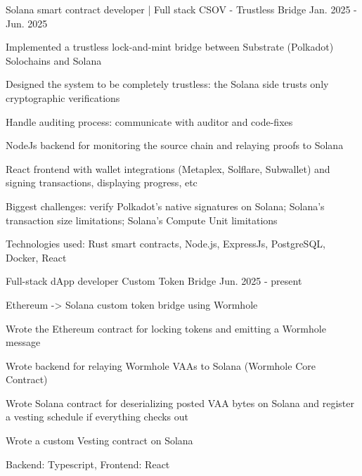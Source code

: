 

\begin{cventries}
 
  \cventry
  {Solana smart contract developer | Full stack} %
  {CSOV - Trustless Bridge} %
  {} %
  {Jan. 2025 - Jun. 2025} %
  {
    \begin{cvitems} %
      \item {Implemented a trustless lock-and-mint bridge between Substrate (Polkadot) Solochains and Solana}
      \item {Designed the system to be completely trustless: the Solana side trusts only cryptographic verifications}
      \item {Handle auditing process: communicate with auditor and code-fixes}
      \item {NodeJs backend for monitoring the source chain and relaying proofs to Solana}
      \item {React frontend with wallet integrations (Metaplex, Solflare, Subwallet) and signing transactions, displaying progress, etc}
      \item {Biggest challenges: verify Polkadot's native signatures on Solana; Solana's transaction size limitations; Solana's Compute Unit limitations}
      \item {Technologies used: Rust smart contracts, Node.js, ExpressJs, PostgreSQL, Docker, React}
    \end{cvitems}
  }

  \cventry
  {Full-stack dApp developer} %
  {Custom Token Bridge} %
  {} %
  {Jun. 2025 - present} %
  {
    \begin{cvitems} %
      \item {Ethereum -> Solana custom token bridge using Wormhole}
      \item {Wrote the Ethereum contract for locking tokens and emitting a Wormhole message}
      \item {Wrote backend for relaying Wormhole VAAs to Solana (Wormhole Core Contract)}
      \item {Wrote Solana contract for deserializing posted VAA bytes on Solana and register a vesting schedule if everything checks out}
      \item {Wrote a custom Vesting contract on Solana}
      \item {Backend: Typescript, Frontend: React}
    \end{cvitems}
  }


\end{cventries}
